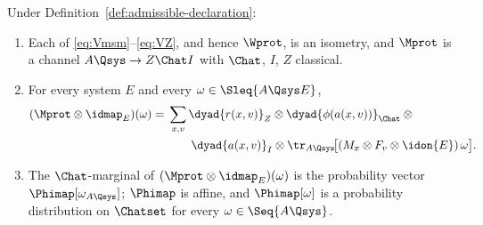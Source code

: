 
\begin{theorem}
\label{thm:protocol-channel}
Under Definition~\ref{def:admissible-declaration}:
\begin{enumerate}[label=(\roman*),leftmargin=2.2em]
\item Each of \eqref{eq:Vmsm}--\eqref{eq:VZ}, and hence $\Wprot$, is an
isometry, and $\Mprot$ is a channel $A\Qsys\to Z\Chat I$ with $\Chat$, $I$,
$Z$ classical.
\item For every system $E$ and every $\omega\in\Sleq{A\Qsys E}$,
\begin{equation}\label{eq:povm-form}
\begin{split}
  (\Mprot\otimes\idmap_E)(\omega)
  ={}&\sum_{x,v}
  \dyad{r(x,v)}_{Z}\otimes\dyad{\phi(a(x,v))}_{\Chat}\otimes{}\\
  &\qquad\dyad{a(x,v)}_{I}\otimes
  \tr_{A\Qsys}\!\big[(M_x\otimes F_v\otimes\idon{E})\,\omega\big].
\end{split}
\end{equation}
\item The $\Chat$-marginal of $(\Mprot\otimes\idmap_E)(\omega)$ is the
probability vector $\Phimap[\omega_{A\Qsys}]$; $\Phimap$ is affine, and
$\Phimap[\omega]$ is a probability distribution on $\Chatset$ for every
$\omega\in\Seq{A\Qsys}$.
\end{enumerate}
\end{theorem}

